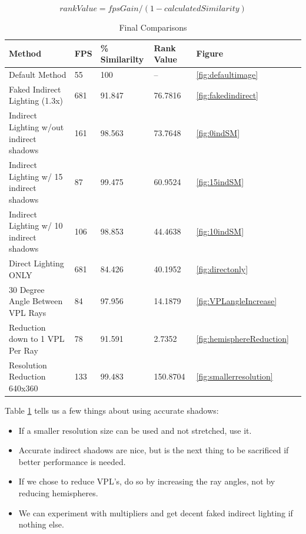 \begin{equation}
rankValue = fpsGain / (1-calculatedSimilarity)
\end{equation}

\begin{table}[h!]
	\caption{Final Comparisons}
	\begin{center}
	    \begin{tabular}{ | l | l | l | l | l | l |}
	    \hline
	    Method & FPS & \% Similarilty & Rank Value & Figure\\ \hline
	    Default Method & 55 & 100 & -- & \ref{fig:defaultimage}\\ \hline
	    Faked Indirect Lighting (1.3x) & 681 & 91.847 & 76.7816 & \ref{fig:fakedindirect}\\ \hline
	    Indirect Lighting w/out indirect shadows & 161 & 98.563 & 73.7648 & \ref{fig:0indSM}\\ \hline
	    Indirect Lighting w/ 15 indirect shadows & 87 & 99.475 & 60.9524 & \ref{fig:15indSM}\\ \hline
	    Indirect Lighting w/ 10 indirect shadows & 106 & 98.853 & 44.4638 & \ref{fig:10indSM}\\ \hline
	    Direct Lighting ONLY & 681 & 84.426 & 40.1952 & \ref{fig:directonly}\\ \hline
	    30 Degree Angle Between VPL Rays & 84 & 97.956 & 14.1879 & \ref{fig:VPLangleIncrease}\\ \hline
	    Reduction down to 1 VPL Per Ray & 78 & 91.591 & 2.7352 & \ref{fig:hemisphereReduction}\\ \hline
	    Resolution Reduction 640x360 & 133 & 99.483 & 150.8704 & \ref{fig:smallerresolution}\\ \hline
	    \end{tabular}
	\end{center}
	\label{table:5.10}
\end{table}

Table \ref{table:5.10} tells us a few things about using accurate shadows:
\begin{itemize}
\item If a smaller resolution size can be used and not stretched, use it.
\item Accurate indirect shadows are nice, but is the next thing to be sacrificed if better performance is needed.
\item If we chose to reduce VPL's, do so by increasing the ray angles, not by reducing hemispheres.
\item We can experiment with multipliers and get decent faked indirect lighting if nothing else.
\end{itemize}

